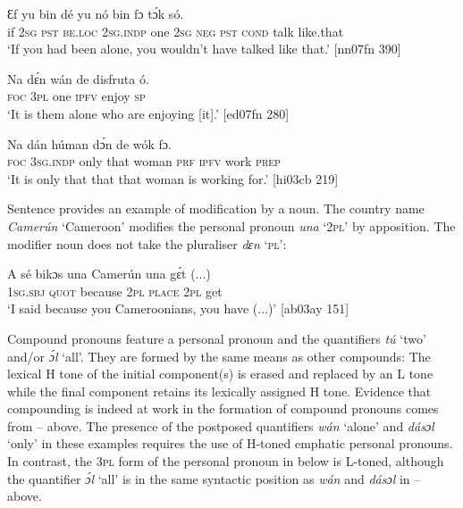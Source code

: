 \ea%
    \label{ex:key:289}
    \gll Ɛf  yu  bin  dé        yu  nó  bin  fɔ    tɔ́k  só.\\
if  \textsc{2sg}  \textsc{pst}  \textsc{be.loc}  \textsc{2sg.indp}  one    \textsc{2sg}  \textsc{neg}  \textsc{pst}  \textsc{cond}    talk  like.that\\

\glt ‘If you had been alone, you wouldn’t have talked like that.’ [nn07fn 390]
\z


\ea%
    \label{ex:key:290}
    \gll Na  dɛ́n    wán    de  disfruta  ó.\\
\textsc{foc}  \textsc{3pl}    one    \textsc{ipfv}  enjoy  \textsc{sp}\\

\glt ‘It is them alone who are enjoying [it].’ [ed07fn 280]
\z


\ea%
    \label{ex:key:291}
    \gll Na     dán  húman  dɔ́n  de  wók    fɔ.\\
\textsc{foc}  \textsc{3sg.indp}  only    that  woman  \textsc{prf}  \textsc{ipfv}  work  \textsc{prep}\\

\glt ‘It is only that that that woman is working for.’ [hi03cb 219]
\z

Sentence  provides an example of modification by a noun. The country name \textit{Camerún} ‘Cameroon’ modifies the personal pronoun \textit{una} ‘2\textsc{pl}’ by apposition. The modifier noun does not take the pluraliser \textit{dɛn} ‘\textsc{pl}’:


\ea%
    \label{ex:key:292}
    \gll A    sé    bikɔs  una  Camerún  una  gɛ́t  (...)\\
\textsc{1sg.sbj}  \textsc{quot}    because  \textsc{2pl}  \textsc{place}    \textsc{2pl}  get\\

\glt ‘I said because you Cameroonians, you have (...)’ [ab03ay 151]
\z

Compound pronouns feature a personal pronoun and the quantifiers \textit{tú} ‘two’ and/or \textit{ɔ́l} ‘all’. They are formed by the same means as other compounds: The lexical H tone of the initial component(s) is erased and replaced by an L tone while the final component retains its lexically assigned H tone. Evidence that compounding is indeed at work in the formation of compound pronouns comes from – above. The presence of the postposed quantifiers \textit{wán} ‘alone’ and \textit{dásɔl} ‘only’ in these examples requires the use of H-toned emphatic personal pronouns. In contrast, the \textsc{3pl} form of the personal pronoun in  below is L-toned, although the quantifier \textit{ɔ́l} ‘all’ is in the same syntactic position as \textit{wán} and \textit{dásɔl} in – above. 


